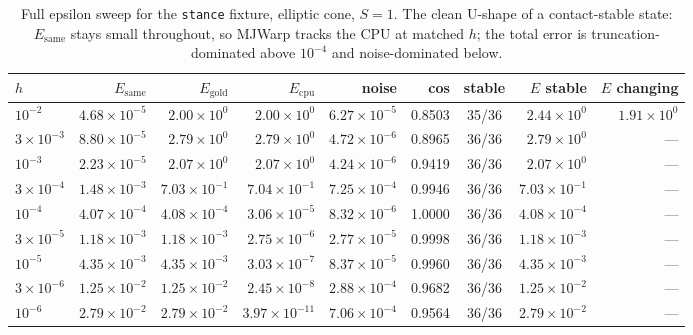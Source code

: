 \documentclass[11pt,a4paper]{article}
\newcommand{\code}[1]{\texttt{\small #1}}
\begin{document}
\begin{table}[htbp]
\centering
\footnotesize
\caption{Full epsilon sweep for the \code{stance} fixture, elliptic cone, $S=1$. The clean U-shape of a contact-stable state: $E_{\mathrm{same}}$ stays small throughout, so MJWarp tracks the CPU at matched $h$; the total error is truncation-dominated above $10^{-4}$ and noise-dominated below.}
\label{tab:sweepstance}
\begin{tabular}{lrrrrrcrr}
\toprule
$h$ & $E_{\mathrm{same}}$ & $E_{\mathrm{gold}}$ & $E_{\mathrm{cpu}}$ & \textbf{noise} & \textbf{cos} & \textbf{stable} & $E$\textbf{ stable} & $E$\textbf{ changing} \\
\midrule
$10^{-2}$ & $4.68\times10^{-5}$ & $2.00\times10^{0}$ & $2.00\times10^{0}$ & $6.27\times10^{-5}$ & 0.8503 & 35/36 & $2.44\times10^{0}$ & $1.91\times10^{0}$ \\
$3\times10^{-3}$ & $8.80\times10^{-5}$ & $2.79\times10^{0}$ & $2.79\times10^{0}$ & $4.72\times10^{-6}$ & 0.8965 & 36/36 & $2.79\times10^{0}$ & --- \\
$10^{-3}$ & $2.23\times10^{-5}$ & $2.07\times10^{0}$ & $2.07\times10^{0}$ & $4.24\times10^{-6}$ & 0.9419 & 36/36 & $2.07\times10^{0}$ & --- \\
$3\times10^{-4}$ & $1.48\times10^{-3}$ & $7.03\times10^{-1}$ & $7.04\times10^{-1}$ & $7.25\times10^{-4}$ & 0.9946 & 36/36 & $7.03\times10^{-1}$ & --- \\
$10^{-4}$ & $4.07\times10^{-4}$ & $4.08\times10^{-4}$ & $3.06\times10^{-5}$ & $8.32\times10^{-6}$ & 1.0000 & 36/36 & $4.08\times10^{-4}$ & --- \\
$3\times10^{-5}$ & $1.18\times10^{-3}$ & $1.18\times10^{-3}$ & $2.75\times10^{-6}$ & $2.77\times10^{-5}$ & 0.9998 & 36/36 & $1.18\times10^{-3}$ & --- \\
$10^{-5}$ & $4.35\times10^{-3}$ & $4.35\times10^{-3}$ & $3.03\times10^{-7}$ & $8.37\times10^{-5}$ & 0.9960 & 36/36 & $4.35\times10^{-3}$ & --- \\
$3\times10^{-6}$ & $1.25\times10^{-2}$ & $1.25\times10^{-2}$ & $2.45\times10^{-8}$ & $2.88\times10^{-4}$ & 0.9682 & 36/36 & $1.25\times10^{-2}$ & --- \\
$10^{-6}$ & $2.79\times10^{-2}$ & $2.79\times10^{-2}$ & $3.97\times10^{-11}$ & $7.06\times10^{-4}$ & 0.9564 & 36/36 & $2.79\times10^{-2}$ & --- \\
\bottomrule
\end{tabular}
\end{table}
\end{document}
